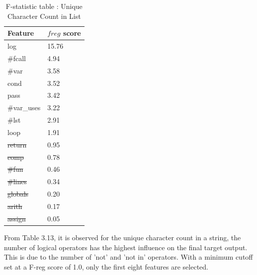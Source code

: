 \begin{itemize}
\begin{table}[H]
\centering
\caption{F-statistic table : Unique Character Count in List}
\begin{tabular}{ll}
\hline
\multicolumn{1}{|l|}{\textbf{Feature}} & \multicolumn{1}{l|}{\textbf{$f{reg}$ score}} \\ \hline
\multicolumn{1}{|l|}{log}              & \multicolumn{1}{l|}{15.76}                 \\ \hline
\multicolumn{1}{|l|}{\#fcall}          & \multicolumn{1}{l|}{4.94}                  \\ \hline
\multicolumn{1}{|l|}{\#var}            & \multicolumn{1}{l|}{3.58}                  \\ \hline
\multicolumn{1}{|l|}{cond}             & \multicolumn{1}{l|}{3.52}                  \\ \hline
\multicolumn{1}{|l|}{pass}             & \multicolumn{1}{l|}{3.42}                  \\ \hline
\multicolumn{1}{|l|}{\#var\_uses}      & \multicolumn{1}{l|}{3.22}                  \\ \hline
\multicolumn{1}{|l|}{\#lst}            & \multicolumn{1}{l|}{2.91}                  \\ \hline
\multicolumn{1}{|l|}{loop}             & \multicolumn{1}{l|}{1.91}                  \\ \hline
\multicolumn{1}{|l|}{\st{return}}           & \multicolumn{1}{l|}{0.95}                  \\ \hline
\multicolumn{1}{|l|}{\st{comp}}             & \multicolumn{1}{l|}{0.78}                  \\ \hline
\multicolumn{1}{|l|}{\st{\#fun}}            & \multicolumn{1}{l|}{0.46}                  \\ \hline
\multicolumn{1}{|l|}{\st{\#lines}}          & \multicolumn{1}{l|}{0.34}                  \\ \hline
\multicolumn{1}{|l|}{\st{globals}}         & \multicolumn{1}{l|}{0.20}                  \\ \hline
\multicolumn{1}{|l|}{\st{arith}}            & \multicolumn{1}{l|}{0.17}                  \\ \hline
\multicolumn{1}{|l|}{\st{assign}}           & \multicolumn{1}{l|}{0.05}      
\\ \hline
\end{tabular}

\label{uc_f}
\end{table}

From Table 3.13, it is observed for the unique character
count in a string, the number of logical operators has the
highest influence on the final target output. This is due to
the number of 'not' and 'not in' operators. With a minimum
cutoff set at a F-reg score of 1.0, only the first eight
features are selected.
\end{itemize}